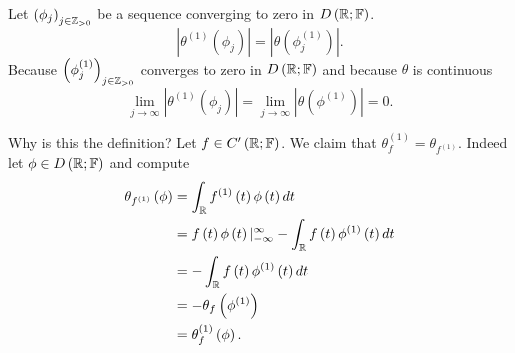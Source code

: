 \begin{example}
\begin{enumerate}
\begin{description}
				Let $\left( \phi_{j} \right)  _{j \in  \mathbb{Z}_{>0}}$ be a sequence converging to zero in $D\left( \mathbb{R}; \mathbb{F} \right) $. 
				\[
					\left| \theta^{\left( 1 \right) } \left( \phi_{j} \right)  \right| = \left| \theta \left( \phi_{j}^{\left( 1 \right) } \right) \right|  
				.\] 
				Because $\left( \phi_{j}^{\left( 1 \right) } \right) _{j \in  \mathbb{Z}_{>0}}$ converges to zero in $D\left( \mathbb{R}; \mathbb{F} \right) $ and because $\theta$ is continuous
	 \[
		 \lim_{j \to \infty} \left| \theta ^{\left( 1 \right) } \left( \phi_{j} \right)  \right|  = \lim_{j \to \infty} \left| \theta\left( \phi^{\left( 1 \right) } \right)  \right|  = 0
	.\] 
		\end{description}
\end{enumerate}	
\end{example}

Why is this the definition? Let $f \in  C'\left( \mathbb{R}; \mathbb{F} \right) $. We claim that $\theta^{\left( 1 \right) }_{f} = \theta_{f^{\left( 1 \right) }}$. Indeed let $\phi \in  D\left( \mathbb{R}; \mathbb{F} \right) $ and compute
\begin{align*}
	\theta _{f^{\left( 1 \right) }}\left( \phi \right)  &=  \int_{\mathbb{R}}^{ } f^{\left( 1 \right) } \left( t \right) \phi \left( t \right)  dt  \\
							       &= f\left( t  \right) \phi\left( t \right) |^{\infty}_{-\infty} - \int_{\mathbb{R}}^{ } f\left( t \right) \phi^{\left( 1 \right) } \left( t \right) dt  \\
							       &= -\int_{\mathbb{R}} f\left( t \right)  \phi^{\left( 1 \right) } \left( t \right)  dt\\
							       &= -\theta_{f} \left( \phi^{\left( 1 \right) } \right)  \\
							       &= \theta_{f}^{\left( 1 \right) } \left( \phi \right)  
.\end{align*}

